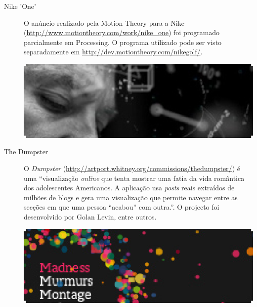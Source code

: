 \begin{description}
\item[Nike 'One'] O anúncio realizado pela Motion Theory para a Nike (\url{http://www.motiontheory.com/work/nike_one}) foi programado parcialmente em Processing. O programa utilizado pode ser visto separadamente em \url{http://dev.motiontheory.com/nikegolf/}.
\begin{center}
	\includegraphics{images/nikeone.eps}
\end{center}

\item[The Dumpster]
O \emph{Dumpster} (\url{http://artport.whitney.org/commissions/thedumpster/}) é uma ``visualização \emph{online} que tenta 
mostrar uma fatia da vida romântica dos adolescentes Americanos. A aplicação usa \emph{posts} reais extraídos de milhões
de blogs e gera uma visualização que permite navegar entre as secções em que uma pessoa ``acabou'' com outra.''.
O projecto foi desenvolvido por Golan Levin, entre outros.
\begin{center}
	\includegraphics{images/wefeelfine.eps}
\end{center}

\end{description}

